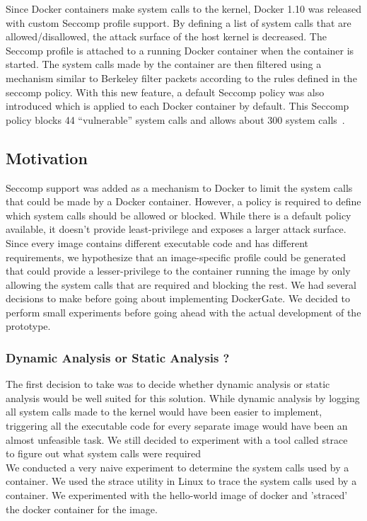 Since Docker containers make system calls to the kernel, Docker 1.10 was released with custom Seccomp profile support. By defining a list of system calls that are allowed/disallowed, the attack surface of the host kernel is decreased. The Seccomp profile is attached to a running Docker container when the container is started. The system calls made by the container are then filtered using a mechanism similar to Berkeley filter packets according to the rules defined in the seccomp policy. With this new feature, a default Seccomp policy was also introduced which is applied to each Docker container by default. This Seccomp policy blocks 44 “vulnerable” system calls and allows about 300 system calls~\cite{defaultseccomp}.
\subsection{Motivation}
Seccomp support was added as a mechanism to Docker to limit the system calls that could be made by a Docker container. However, a policy is required to define which system calls should be allowed or blocked. While there is a default policy available, it doesn’t provide least-privilege and exposes a larger attack surface. Since every image contains different executable code and has different requirements, we hypothesize that an image-specific profile could be generated that could provide a lesser-privilege to the container running the image by only allowing the system calls that are required and blocking the rest.  
We had several decisions to make before going about implementing DockerGate. We decided to perform small experiments before going ahead with the actual development of the prototype.
\subsubsection{Dynamic Analysis or Static Analysis ?}
The first decision to take was to decide whether dynamic analysis or static analysis would be well suited for this solution. While dynamic analysis by logging all system calls made to the kernel would have been easier to implement, triggering all the executable code for every separate image would have been an almost unfeasible task. We still decided to experiment with a tool called strace~\cite{strace} to figure out what system calls were required\\

We conducted a very naive experiment to determine the system calls used by a container. We used the strace utility in Linux to trace the system calls used by a container. We experimented with the hello-world image of docker and 'straced' the docker container for the image.

